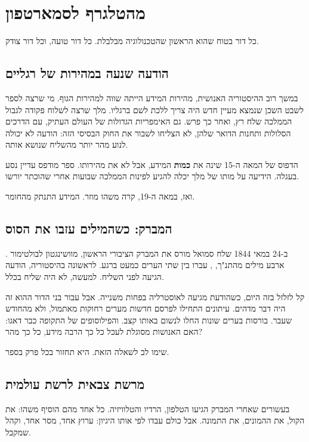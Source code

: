 \chapter{מהטלגרף לסמארטפון}

\begin{epigraph}{}
כל דור בטוח שהוא הראשון שהטכנולוגיה מבלבלת. כל דור טועה, וכל דור צודק.
\end{epigraph}

\section{הודעה שנעה במהירות של רגליים}

במשך רוב ההיסטוריה האנושית, מהירות המידע הייתה שווה למהירות הגוף. מי שרצה לספר לשבט השכן שנמצא מעיין חדש היה צריך ללכת לשם ברגליו. מלך שרצה לשלוח פקודה לגבול הממלכה שלח רץ, ואחר כך פרש. גם האימפריות הגדולות של העולם העתיק, עם הדרכים הסלולות ותחנות הדואר שלהן, לא הצליחו לשבור את החוק הבסיסי הזה: הודעה לא יכולה לנוע מהר יותר מהשליח שנושא אותה.

הדפוס של המאה ה-15 שינה את \textbf{כמות} המידע, אבל לא את מהירותו. ספר מודפס עדיין נסע בעגלה. הידיעה על מותו של מלך יכלה להגיע לפינות הממלכה שבועות אחרי שהוכתר יורשו.

ואז, במאה ה-19, קרה משהו מוזר. המידע התנתק מהחומר.

\section{המברק: כשהמילים עזבו את הסוס}

ב-24 במאי \num{1844} שלח סמואל מורס את המברק הציבורי הראשון, מוושינגטון לבולטימור \parencite{loc1844}. ארבע מילים מהתנ"ך, , עברו בין שתי הערים כמעט ברגע. לראשונה בהיסטוריה, הודעה הגיעה לפני השליח. למעשה, לא היה שליח בכלל.

קל לזלזל בזה היום, כשהודעת  מגיעה לאוסטרליה בפחות משנייה. אבל עבור בני הדור ההוא זה היה דבר מדהים. עיתונים התחילו לפרסם חדשות מערים רחוקות מאתמול, ולא מהחודש שעבר. בורסות בערים שונות החלו לנשום באותו קצב. והפילוסופים של התקופה כבר דאגו: האם האנושות מסוגלת לעכל כל כך הרבה מידע, כל כך מהר?

שימו לב לשאלה הזאת. היא תחזור בכל פרק בספר.

\section{מרשת צבאית לרשת עולמית}

בעשורים שאחרי המברק הגיעו הטלפון, הרדיו והטלוויזיה. כל אחד מהם הוסיף משהו: את הקול, את ההמונים, את התמונה. אבל כולם עבדו לפי אותו היגיון: ערוץ אחד, מסר אחד, וקהל שמקבל.

